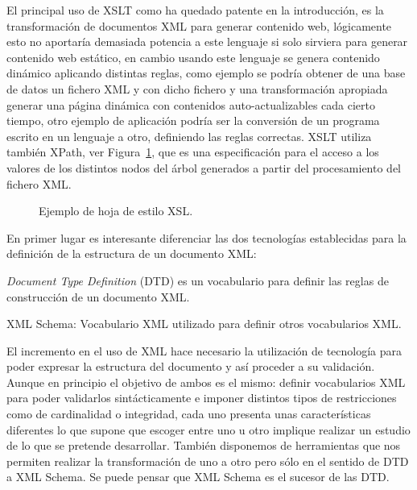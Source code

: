 \begin{description}
El principal uso de XSLT como ha quedado patente en la introducción, es la transformación
de documentos XML para generar contenido web, lógicamente esto no aportaría demasiada potencia
a este lenguaje si solo sirviera para generar contenido web estático, en cambio usando
este lenguaje se genera contenido dinámico aplicando distintas reglas, como ejemplo se
podría obtener de una base de datos un fichero XML y con dicho fichero y una transformación
apropiada generar una página dinámica con contenidos auto-actualizables cada cierto tiempo, otro 
ejemplo de aplicación podría ser la conversión de un programa escrito en un lenguaje a otro, definiendo las reglas correctas. 
XSLT utiliza también \gls{XPath}, ver Figura~\ref{fig:xsl-example}, que es una especificación
para el acceso a los valores de los distintos nodos del árbol generados a partir del procesamiento
del fichero XML. 

\begin{figure}[!hbp]
\centering
\small

\caption{Ejemplo de hoja de estilo XSL.}
\label{fig:xsl-example}
\end{figure}


\item[\gls{XML Schema}~\cite{XMLSchema}.] En primer lugar es interesante diferenciar las dos
tecnologías establecidas para la definición de la estructura de un documento
XML: \begin{inparaenum}
     \item \textit{Document Type Definition} (\gls{DTD}) es un vocabulario para definir las
     reglas de construcción de un documento XML.     
     \item XML Schema: Vocabulario XML utilizado para definir otros vocabularios
     XML.  
     \end{inparaenum}

El incremento en el uso de \gls{XML} hace necesario la utilización de tecnología para poder
expresar la estructura del documento y así proceder a su validación. Aunque en principio el objetivo de ambos es el mismo: 
definir vocabularios XML para poder validarlos sintácticamente e imponer distintos tipos de 
restricciones como de cardinalidad o integridad, cada uno presenta unas características diferentes 
lo que supone que escoger entre uno u otro implique realizar un estudio de lo que se pretende desarrollar.
También disponemos de herramientas que nos permiten realizar la transformación de uno a
otro pero sólo en el sentido de DTD a XML Schema. Se puede pensar que XML Schema es el
sucesor de las DTD.


\end{description}
